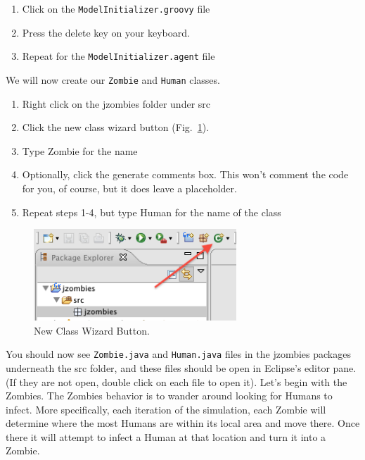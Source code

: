 \documentclass[11pt]{amsart}
\begin{document}
\vspace{.2in}
\begin{enumerate}
\item Click on the  \texttt{ModelInitializer.groovy} file
\item Press the delete key on your keyboard. 
\item Repeat for the \texttt{ModelInitializer.agent} file
\end{enumerate}

\vspace{.2in}
We will now create our \texttt{Zombie} and \texttt{Human} classes.
\begin{enumerate}
\item Right click on the jzombies folder under src
\item Click the new class wizard button (Fig.~\ref{fig:class_wizard}).
\item Type Zombie for the name
\item Optionally, click the generate comments box. This won't comment the code for you, of course, but it does
leave a placeholder.
\item Repeat steps 1-4, but type Human for the name of the class
\end{enumerate}

\begin{figure}[h]
\begin{center}
\vspace{.2in}
\centerline {
\includegraphics[width=3in]{GettingStartedImages/class_wizard.png}
}
\caption{New Class Wizard Button.}
\label{fig:class_wizard}
\end{center}
\end{figure}

You should now see  \texttt{Zombie.java}  and \texttt{Human.java} files in the jzombies packages underneath the src folder, and these files should be open in Eclipse's editor pane. (If they are not open, double click on each file to open it). Let's begin with the Zombies. The Zombies behavior is to wander around looking for Humans to infect. More specifically, each iteration of the simulation, each Zombie will determine where the most Humans are within its local area and move there. Once there it will attempt to infect a Human at that location and turn it into a Zombie. 
\end{document}
